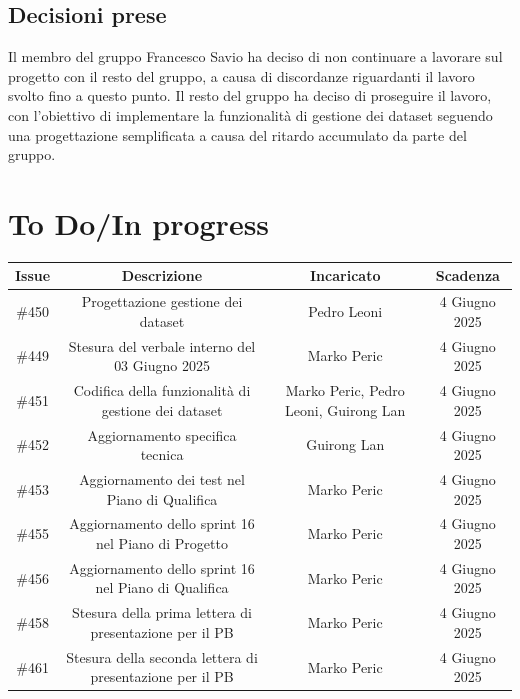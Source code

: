 \documentclass[a4paper, 12pt]{article}
\begin{document}
\subsection{Decisioni prese}
    Il membro del gruppo Francesco Savio ha deciso di non continuare a lavorare sul progetto con il resto del gruppo, a causa di discordanze riguardanti il lavoro svolto fino a questo punto.
    Il resto del gruppo ha deciso di proseguire il lavoro, con l'obiettivo di implementare la funzionalità di gestione dei dataset seguendo una progettazione semplificata a causa del ritardo accumulato da parte del gruppo.


\section{To Do/In progress}
\begin{tabularx}{\textwidth}{|c|C|C|C|}
    \hline
        \textbf{Issue} & \textbf{Descrizione} & \textbf{Incaricato} & \textbf{Scadenza}\\
    \hline    
        \#450 & Progettazione gestione dei dataset & Pedro Leoni & 4 Giugno 2025\\
    \hline
        \#449 & Stesura del verbale interno del 03 Giugno 2025 & Marko Peric & 4 Giugno 2025\\
    \hline
        \#451 & Codifica della funzionalità di gestione dei dataset & Marko Peric, Pedro Leoni, Guirong Lan & 4 Giugno 2025\\
    \hline
        \#452 & Aggiornamento specifica tecnica & Guirong Lan & 4 Giugno 2025\\
    \hline
        \#453 & Aggiornamento dei test nel Piano di Qualifica & Marko Peric & 4 Giugno 2025\\
    \hline
        \#455 & Aggiornamento dello sprint 16 nel Piano di Progetto & Marko Peric & 4 Giugno 2025\\
    \hline
        \#456 & Aggiornamento dello sprint 16 nel Piano di Qualifica & Marko Peric & 4 Giugno 2025\\
    \hline
        \#458 & Stesura della prima lettera di presentazione per il PB & Marko Peric & 4 Giugno 2025\\
    \hline
        \#461 & Stesura della seconda lettera di presentazione per il PB & Marko Peric & 4 Giugno 2025\\
    \hline
    \end{tabularx}
\end{document}
